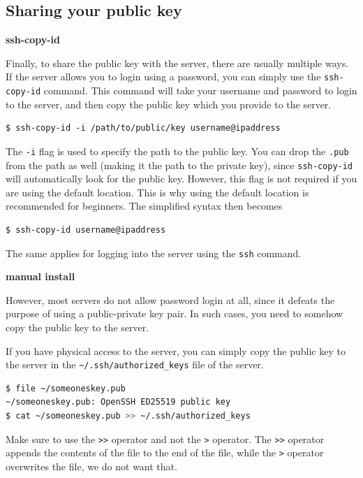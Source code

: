 \subsection{Sharing your public key}

\textbf{ssh-copy-id}

Finally, to share the public key with the server,
there are usually multiple ways. If the server
allows you to login using a password, you can
simply use the \lstinline|ssh-copy-id| command.
This command will take your username and password
to login to the server, and then copy the public
key which you provide to the server.

\begin{lstlisting}
$ ssh-copy-id -i /path/to/public/key username@ipaddress
\end{lstlisting}

\begin{remark}
  The \lstinline|-i| flag is used to specify the path
  to the public key. You can drop the \lstinline|.pub|
  from the path as well (making it the path to the
  private key), since \lstinline|ssh-copy-id| will
  automatically look for the public key.
  However, this flag is not required if you
  are using the default location.
  This is why using the default location is
  recommended for beginners.
  The simplified syntax then becomes
  \begin{lstlisting}[language=bash]
  $ ssh-copy-id username@ipaddress \end{lstlisting}
  The same applies for logging into the server
  using the \lstinline|ssh| command.
\end{remark}

\textbf{manual install}

However, most servers do not allow password login
at all, since it defeats the purpose of using
a public-private key pair. In such cases, you
need to somehow copy the public key to the server.

If you have physical access to the server, you
can simply copy the public key to the server
in the \lstinline|~/.ssh/authorized_keys| file
of the server.

\begin{lstlisting}[language=bash]
$ file ~/someoneskey.pub
~/someoneskey.pub: OpenSSH ED25519 public key
$ cat ~/someoneskey.pub >> ~/.ssh/authorized_keys
\end{lstlisting}

\begin{remark}
  Make sure to use the \lstinline|>>| operator and
  not the \lstinline|>| operator. The \lstinline|>>|
  operator appends the contents of the file to
  the end of the file, while the \lstinline|>|
  operator overwrites the file, we do not want that.
\end{remark}

